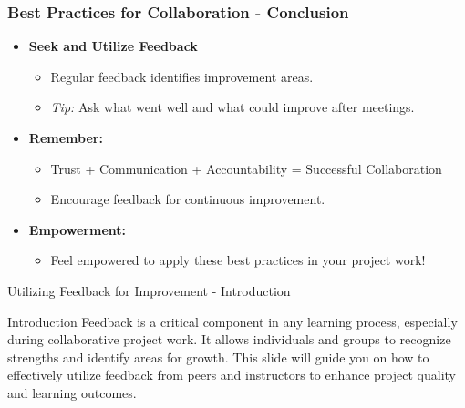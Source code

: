 \documentclass[aspectratio=169]{beamer}
\begin{document}
\begin{frame}[fragile]
    \frametitle{Best Practices for Collaboration - Conclusion}
    \begin{itemize}
        \item \textbf{Seek and Utilize Feedback}
            \begin{itemize}
                \item Regular feedback identifies improvement areas.
                \item \textit{Tip:} Ask what went well and what could improve after meetings.
            \end{itemize}
            
        \item \textbf{Remember:}
            \begin{itemize}
                \item Trust + Communication + Accountability = Successful Collaboration
                \item Encourage feedback for continuous improvement.
            \end{itemize}
        
        \item \textbf{Empowerment:} 
            \begin{itemize}
                \item Feel empowered to apply these best practices in your project work!
            \end{itemize}
    \end{itemize}
\end{frame}

\begin{frame}[fragile]{Utilizing Feedback for Improvement - Introduction}
    \begin{block}{Introduction}
        Feedback is a critical component in any learning process, especially during collaborative project work. It allows individuals and groups to recognize strengths and identify areas for growth. 
        This slide will guide you on how to effectively utilize feedback from peers and instructors to enhance project quality and learning outcomes.
    \end{block}
\end{frame}
\end{document}
